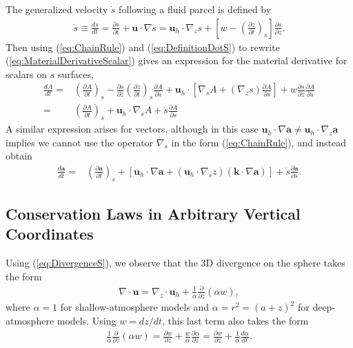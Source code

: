 \documentclass[gmd, manuscript]{copernicus}
\newcommand{\vb}{\mathbf}
\newcommand{\diff}[2]{\frac{d #1}{d #2}}
\newcommand{\pdiff}[2]{\frac{\partial #1}{\partial #2}}
\begin{document}
The generalized velocity $\dot{s}$ following a fluid parcel is defined by
\begin{align} \label{eq:DefinitionDotS}
\dot{s} \equiv \diff{s}{t} = \pdiff{s}{t} + \vb{u} \cdot \nabla s = \vb{u}_h \cdot \nabla_z s + \left[ w - \left( \pdiff{z}{t} \right)_s \right] \pdiff{s}{z}.
\end{align}  Then using (\ref{eq:ChainRule}) and (\ref{eq:DefinitionDotS}) to rewrite (\ref{eq:MaterialDerivativeScalar}) gives an expression for the material derivative for scalars on $s$ surfaces,
\begin{align}
\diff{A}{t} =& \left( \pdiff{A}{t} \right)_s - \pdiff{s}{z} \left( \pdiff{z}{t} \right)_s \pdiff{A}{s} + \vb{u}_h \cdot \left[ \nabla_s A + (\nabla_z s) \pdiff{A}{s} \right] + w \pdiff{s}{z} \pdiff{A}{s} \\
=& \left( \pdiff{A}{t} \right)_s  + \vb{u}_h \cdot \nabla_s A + \dot{s} \pdiff{A}{s}  \label{eq:MaterialDerivativeS}
\end{align}  A similar expression arises for vectors, although in this case $\vb{u}_h \cdot \nabla \vb{a} \neq \vb{u}_h \cdot \nabla_z \vb{a}$ implies we cannot use the operator $\nabla_s$ in the form (\ref{eq:ChainRule}), and instead obtain
\begin{align} \label{eq:MaterialDerivativeVectorS}
\diff{\vb{a}}{t} =& \left( \pdiff{\vb{a}}{t} \right)_s + \left[ \vb{u}_h \cdot \nabla \vb{a} + (\vb{u}_h \cdot \nabla_s z) (\vb{k} \cdot \nabla \vb{a}) \right] + \dot{s} \pdiff{\vb{a}}{s}.
\end{align}


\subsection{Conservation Laws in Arbitrary Vertical Coordinates}

Using (\ref{eq:DivergenceS}), we observe that the 3D divergence on the sphere takes the form
\begin{align} \label{eq:ThreeDDivergence}
\nabla \cdot \vb{u} = \nabla_z \cdot \vb{u}_h + \frac{1}{\alpha} \pdiff{}{z} (\alpha w),
\end{align} where $\alpha = 1$ for shallow-atmosphere models and $\alpha = r^2 = (a + z)^2$ for deep-atmosphere models.  Using $w = dz/dt$, this last term also takes the form
\begin{align} \label{eq:GeneralVerticalTermX}
\frac{1}{\alpha} \pdiff{}{z} (\alpha w) = \pdiff{w}{z} + \frac{w}{\alpha} \pdiff{\alpha}{z} = \pdiff{w}{z} + \frac{1}{\alpha} \diff{\alpha}{t}.
\end{align}
\end{document}
